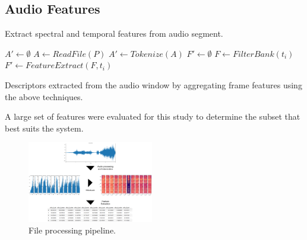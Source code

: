 \subsection{Audio Features}
\begin{algorithm}
    \caption{Extract spectral and temporal features from audio segment.}
    \label{alg:encoder}
    \SetAlgoLined
        
     {
        $A' \gets \emptyset$\;
        $A \gets ReadFile(P)$\;
        $A' \gets Tokenize(A)$\;
         {
            $F' \gets \emptyset$\;
            $F \gets FilterBank(t_i)$
            $F' \gets FeatureExtract(F, t_i)$
        }
    }
\end{algorithm}


\begin{table}[t!]
\centering

\caption{
 Descriptors extracted from the audio window by
 aggregating frame features using the above techniques. }
\label{tab:stats}
\end{table}

A large set of features were evaluated for this study to determine the subset that best suits the system.

\begin{figure}[h!]
    \centering
    \includegraphics[width=0.49\textwidth]{figures/processing-pipeline.png}
    \caption{File processing pipeline.}
    \label{fig:my-label}
\end{figure}

